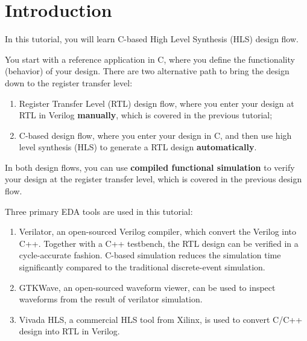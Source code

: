 \documentclass[12pt]{article}
\begin{document}
\pagebreak


\section{Introduction}

In this tutorial, you will learn C-based High Level Synthesis (HLS)
design flow.

You start with a reference application in C, where you define the
functionality (behavior) of your design. There are two alternative
path to bring the design down to the register transfer level:

\begin{enumerate}
\item Register Transfer Level (RTL) design flow, where you enter your
  design at RTL in Verilog {\bf manually}, which is covered in the
  previous tutorial;
  
\item C-based design flow, where you enter your design in C, and then
  use high level synthesis (HLS) to generate a RTL design {\bf
    automatically}.
\end{enumerate}

In both design flows, you can use {\bf compiled functional simulation} to
verify your design at the register transfer level, which is covered in the
previous design flow.

Three primary EDA tools are used in this tutorial:

\begin{enumerate}
\item Verilator, an open-sourced Verilog compiler, which convert the
  Verilog into C++. Together with a C++ testbench, the RTL design can
  be verified in a cycle-accurate fashion.  C-based simulation reduces
  the simulation time significantly compared to the traditional
  discrete-event simulation.

\item GTKWave, an open-sourced waveform viewer, can be used to inspect
  waveforms from the result of verilator simulation.
  
\item Vivada HLS, a commercial HLS tool from Xilinx, is used to convert
  C/C++ design into RTL in Verilog.

\end{enumerate}
\end{document}

